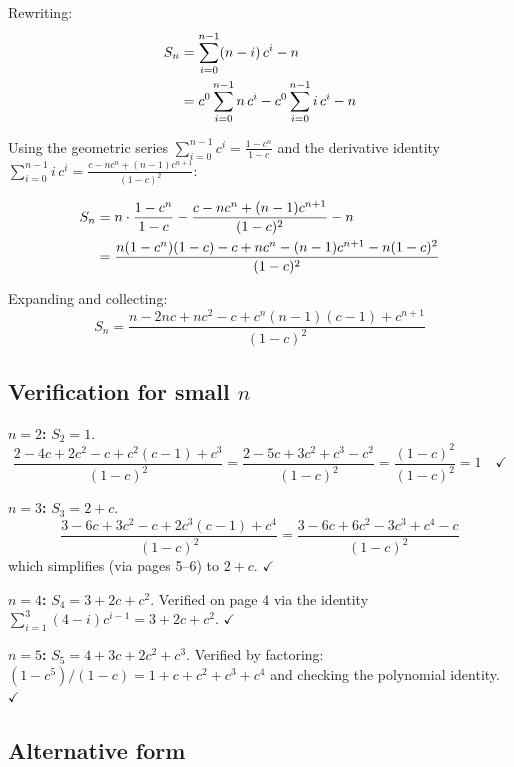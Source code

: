 \documentclass[11pt]{article}
\begin{document}
Rewriting:
\begin{align}
  S_n &= \sum_{i=0}^{n-1} (n-i)\, c^i - n \notag \\
  &= c^0 \sum_{i=0}^{n-1} n\, c^i
    - c^0 \sum_{i=0}^{n-1} i\, c^i - n
\end{align}

Using the geometric series
$\sum_{i=0}^{n-1} c^i = \frac{1-c^n}{1-c}$
and the derivative identity
$\sum_{i=0}^{n-1} i\, c^i
= \frac{c - nc^n + (n-1)c^{n+1}}{(1-c)^2}$:

\begin{align}
  S_n &= n\cdot\frac{1-c^n}{1-c}
    - \frac{c - nc^n + (n-1)c^{n+1}}{(1-c)^2} - n
    \notag \\
  &= \frac{n(1-c^n)(1-c) - c + nc^n - (n-1)c^{n+1}
    - n(1-c)^2}{(1-c)^2}
\end{align}

Expanding and collecting:
\begin{equation}
  \boxed{
    S_n = \frac{n - 2nc + nc^2 - c + c^n(n-1)(c-1)
      + c^{n+1}}{(1-c)^2}
  }
\end{equation}

\subsection{Verification for small $n$}

\textbf{$n = 2$:} $S_2 = 1$.
\begin{equation}
  \frac{2 - 4c + 2c^2 - c + c^2(c - 1) + c^3}{(1-c)^2}
  = \frac{2 - 5c + 3c^2 + c^3 - c^2}{(1-c)^2}
  = \frac{(1-c)^2}{(1-c)^2} = 1 \quad\checkmark
\end{equation}

\textbf{$n = 3$:} $S_3 = 2 + c$.
\begin{equation}
  \frac{3 - 6c + 3c^2 - c + 2c^3(c-1) + c^4}{(1-c)^2}
  = \frac{3 - 6c + 6c^2 - 3c^3 + c^4 - c}{(1-c)^2}
\end{equation}
which simplifies (via pages 5--6) to $2 + c$. $\checkmark$

\textbf{$n = 4$:} $S_4 = 3 + 2c + c^2$.
Verified on page 4 via the identity
$\sum_{i=1}^{3}(4-i)c^{i-1} = 3 + 2c + c^2$.
$\checkmark$

\textbf{$n = 5$:} $S_5 = 4 + 3c + 2c^2 + c^3$.
Verified by factoring: $(1-c^5)/(1-c) = 1 + c + c^2 + c^3
+ c^4$ and checking the polynomial identity. $\checkmark$

\subsection{Alternative form}
\end{document}
